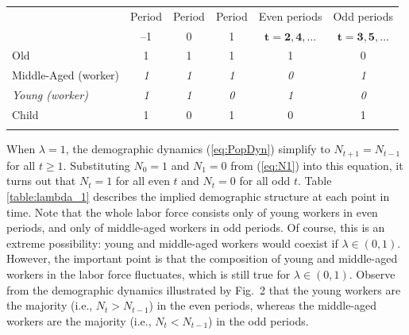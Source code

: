 \documentclass{MBE}%
\begin{document}
{\begin{table}[!t]
{\tabcolsep=0pt\begin{tabular*}{\textwidth}{@{\extracolsep{\fill}}lccccc@{}}\toprule
& Period  & Period &  Period &  Even periods  &  Odd periods\\
& --1 &  0  &  1  & $\boldsymbol{t=2,4,\dots}$ & $\boldsymbol{t=3,5,\dots}$\\\colrule
 Old & 1 & 1 & 1 & 1 & 0\\[.1pt]
 Middle-Aged (worker) & \textit{1} & \textit{1} & \textit{1} &
\textit{0} & \textit{1}\\
\textit{Young (worker)} & \textit{1} & \textit{1} & \textit{0} & \textit{1} &
\textit{0}\\
Child & 1 & 0 & 1 & 0 & 1\\\botrule
\end{tabular*}}
{}
\end{table}

When $\lambda=1$, the demographic dynamics (\ref{eq:PopDyn}) simplify to $N_{t+1}=N_{t-1}$ for all
$t \geq1$. Substituting $N_{0}=1$ and $N_{1}=0$ from (\ref{eq:N1}) into this equation, it turns
out that $N_{t}=1$ for all even $t$ and $N_{t}=0$ for all odd $t$. Table \ref{table:lambda_1}
describes the implied demographic structure at each point in time. Note that the whole labor force
consists only of young workers in even periods, and only of middle-aged workers in odd periods.
{Of course, this is an extreme possibility: young and middle-aged workers would coexist if
$\lambda\in\left(  0,1\right) $. However, the important point is that the composition of young and
middle-aged workers in the labor force fluctuates, which is still true for $\lambda\in(0,1)$.
Observe from the demographic dynamics illustrated by Fig.~2 that the young workers are the
majority (i.e., $N_{t}>N_{t-1}$) in the even periods, whereas the middle-aged workers are the
majority (i.e., $N_{t}<N_{t-1}$) in the odd periods.}

}
\end{document}
